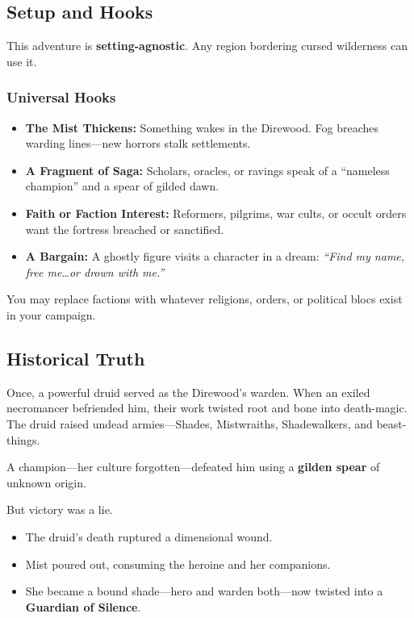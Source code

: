 \documentclass[11pt]{article}
\begin{document}
\subsection{Setup and Hooks}

This adventure is \textbf{setting-agnostic}. Any region bordering cursed wilderness can use it.

\subsubsection*{Universal Hooks}

\begin{itemize}
  \item \textbf{The Mist Thickens:} Something wakes in the Direwood. Fog breaches warding lines---new horrors stalk settlements.
  \item \textbf{A Fragment of Saga:} Scholars, oracles, or ravings speak of a ``nameless champion'' and a spear of gilded dawn.
  \item \textbf{Faith or Faction Interest:} Reformers, pilgrims, war cults, or occult orders want the fortress breached or sanctified.
  \item \textbf{A Bargain:} A ghostly figure visits a character in a dream:  
        \emph{``Find my name, free me\dots or drown with me.''}
\end{itemize}

You may replace factions with whatever religions, orders, or political blocs exist in your campaign.

\subsection{Historical Truth}

Once, a powerful druid served as the Direwood's warden.  
When an exiled necromancer befriended him, their work twisted root and bone into death-magic. The druid raised undead armies---Shades, Mistwraiths, Shadewalkers, and beast-things.

A champion---her culture forgotten---defeated him using a \textbf{gilden spear} of unknown origin.

But victory was a lie.

\begin{itemize}
  \item The druid's death ruptured a dimensional wound.
  \item Mist poured out, consuming the heroine and her companions.
  \item She became a bound shade---hero and warden both---now twisted into a \textbf{Guardian of Silence}.
\end{itemize}
\end{document}
